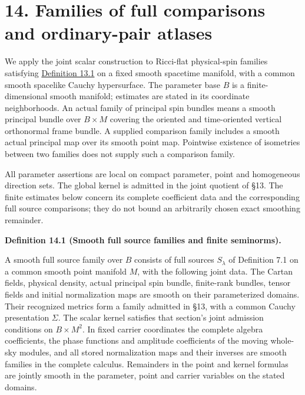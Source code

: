 \documentclass[
  english,
  11pt,
  reqno]{amsart}
\makeatletter
\newcommand{\pandocstatementheading}[1]{%
  \par\addpenalty{\@beginparpenalty}%
  \addvspace{.5\baselineskip plus .2\baselineskip minus .2\baselineskip}%
  {\normalfont\bfseries #1\par}%
  \nobreak\@afterindenttrue\@afterheading
}
\newcommand{\paperblockheading}[2][.45\baselineskip]{%
  \par\Needspace{6\baselineskip}%
  \addvspace{\baselineskip}%
  \noindent{\normalfont\bfseries #2}\par\nobreak
  \vskip#1\relax\nobreak
}
\makeatother
\begin{document}
\protect{}\label{sec:parameter-family-correspondence}

\section{14. Families of full comparisons and ordinary-pair
atlases}\label{families-of-full-comparisons-and-ordinary-pair-atlases}

We apply the joint scalar construction to Ricci-flat physical-spin
families satisfying
\hyperref[def:common-cauchy-metric-family]{Definition 13.1} on a fixed
smooth spacetime manifold, with a common smooth spacelike Cauchy
hypersurface. The parameter base \(B\) is a finite-dimensional smooth
manifold; estimates are stated in its coordinate neighborhoods. An
actual family of principal spin bundles means a smooth principal bundle
over \(B\times M\) covering the oriented and time-oriented vertical
orthonormal frame bundle. A supplied comparison family includes a smooth
actual principal map over its smooth point map. Pointwise existence of
isometries between two families does not supply such a comparison
family.

All parameter assertions are local on compact parameter, point and
homogeneous direction sets. The global kernel is admitted in the joint
quotient of §13. The finite estimates below concern its complete
coefficient data and the corresponding full source comparisons; they do
not bound an arbitrarily chosen exact smoothing remainder.

\paperblockheading[0pt]{Families on a fixed manifold.}

\pandocstatementheading{\protect{}\label{def:common-parent-source-families}Definition 14.1 (Smooth full source families and finite seminorms).}

A smooth full source family over \(B\) consists of full sources
\(S_\lambda\) of Definition 7.1 on a common smooth point manifold \(M\),
with the following joint data. The Cartan fields, physical density,
actual principal spin bundle, finite-rank bundles, tensor fields and
initial normalization maps are smooth on their parameterized domains.
Their recognized metrics form a family admitted in §13, with a common
Cauchy presentation \(\Sigma\). The scalar kernel satisfies that
section's joint admission conditions on \(B\times M^2\). In fixed
carrier coordinates the complete algebra coefficients, the phase
functions and amplitude coefficients of the moving whole-sky modules,
and all stored normalization maps and their inverses are smooth families
in the complete calculus. Remainders in the point and kernel formulas
are jointly smooth in the parameter, point and carrier variables on the
stated domains.
\end{document}
